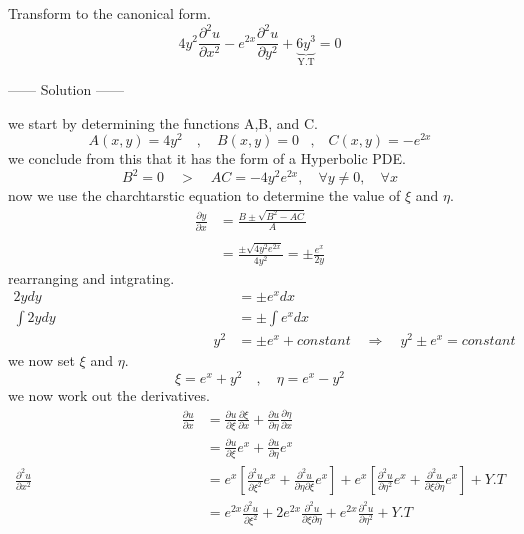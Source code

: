 \documentclass[]{article}
\begin{document}
\begin{example}
    Transform to the canonical form.
    \[
        4y^2\frac{\partial^2 u}{\partial x^2}-e^{2x}\frac{\partial^2 u}{\partial y^2}+\underbrace{6y^3}_{\text{Y.T}} = 0    
    \]
    \begin{center}
        ------ \textcolor{Solution}{Solution} ------ 
    \end{center}
    we start by determining the functions A,B, and C.
    \[
        A\left(x,y\right)=4y^2 \quad,\quad B\left(x,y\right)=0 \;\;\;,\;\;\; C\left(x,y\right)=-e^{2x}    
    \]
    we conclude from this that it has the form of a Hyperbolic PDE.
    \[
        B^2 =0 \quad>\quad AC=-4y^2e^{2x}, \quad \forall y\neq0,\quad \forall x    
    \]
    now we use the charchtarstic equation to determine the value of $\xi$ and $\eta$.
    \begin{align*}
        \frac{\partial y}{\partial x} &= \frac{B\pm\sqrt{B^2 -AC}}{A}\\
        \\
        &= \frac{\pm\sqrt{4y^2 e^{2x}}}{4y^2}=\pm\frac{e^x}{2y}
    \end{align*}
    rearranging and intgrating.
    \begin{align*}
        2ydy &= \pm e^x dx
        \\
        \int 2ydy &= \pm \int e^x dx
        \\ \hspace{6cm}
        y^2 &= \pm e^x + constant \quad \Longrightarrow \quad y^2 \pm e^x = constant 
    \end{align*}
    we now set $\xi$ and $\eta$.
    \[
        \xi = e^x + y^2 \quad , \quad \eta = e^x - y^2    
    \]
    we now work out the derivatives.
    \begin{align*}
        \hspace{5cm}
        \frac{\partial u}{\partial x} &= \frac{\partial u}{\partial\xi}\frac{\partial\xi}{\partial x} + \frac{\partial u }{\partial\eta}\frac{\partial\eta}{\partial x}
        \\
        &= \frac{\partial u}{\partial\xi}e^x+\frac{\partial u}{\partial\eta}e^x
        \\
        \frac{\partial^2 u}{\partial x^2} &= e^x\left[\frac{\partial^2 u}{\partial\xi^2} e^x + \frac{\partial^2 u}{\partial\eta\partial\xi}e^x\right]+e^x\left[\frac{\partial^2 u}{\partial\eta^2} e^x + \frac{\partial^2 u}{\partial\xi\partial\eta}e^x\right]+Y.T
        \\
        &= e^{2x}\frac{\partial^2 u}{\partial\xi^2}+2e^{2x}\frac{\partial^2 u}{\partial\xi\partial\eta}+e^{2x}\frac{\partial^2 u}{\partial\eta^2}+Y.T

\end{align*}
\end{example}
\end{document}
